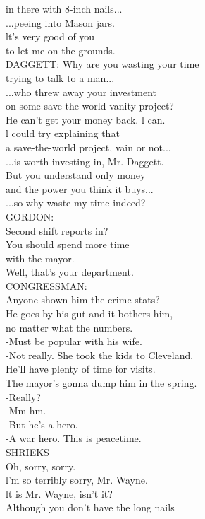\documentclass{article}
\begin{document}
\begin{multicols}{3}
in there with 8-inch nails...\\
...peeing into Mason jars.\\
lt's very good of you\\
to let me on the grounds.\\
DAGGETT: Why are you wasting your time\\
trying to talk to a man...\\
...who threw away your investment\\
on some save-the-world vanity project?\\
He can't get your money back. l can.\\
l could try explaining that\\
a save-the-world project, vain or not...\\
...is worth investing in, Mr. Daggett.\\
But you understand only money\\
and the power you think it buys...\\
...so why waste my time indeed?\\
GORDON:\\
Second shift reports in?\\
You should spend more time\\
with the mayor.\\
Well, that's your department.\\
CONGRESSMAN:\\
Anyone shown him the crime stats?\\
He goes by his gut and it bothers him,\\
no matter what the numbers.\\
-Must be popular with his wife.\\
-Not really. She took the kids to Cleveland.\\
He'll have plenty of time for visits.\\
The mayor's gonna dump him in the spring.\\
-Really?\\
-Mm-hm.\\
-But he's a hero.\\
-A war hero. This is peacetime.\\
SHRIEKS\\
Oh, sorry, sorry.\\
l'm so terribly sorry, Mr. Wayne.\\
lt is Mr. Wayne, isn't it?\\
Although you don't have the long nails\\

\end{multicols}
\end{document}
